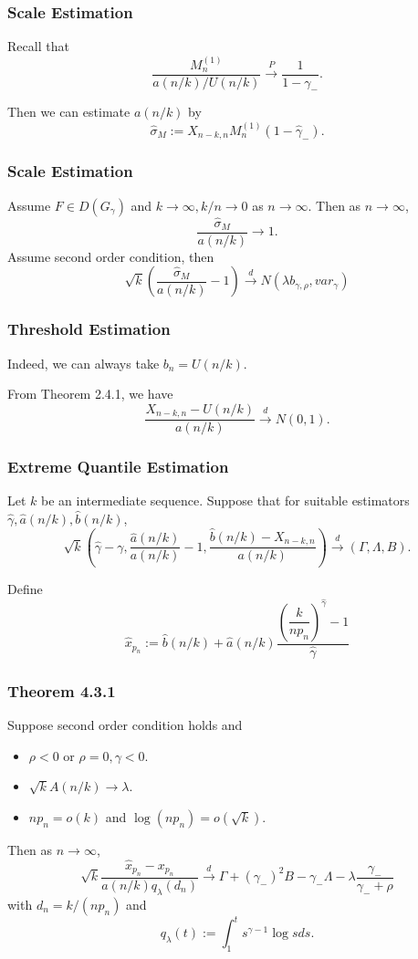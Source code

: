 \documentclass{beamer}
\begin{document}
\begin{frame}
    \frametitle{Scale Estimation}
Recall that
$$
\dfrac{M_n^{(1)}}{a(n/k)/U(n/k)}\stackrel{P}{\to} \dfrac{1}{1-\gamma_{-}}.
$$

Then we can estimate $a(n/k)$ by
$$
\hat{\sigma}_M:=X_{n-k,n}M_n^{(1)}(1-\hat{\gamma}_{-}).
$$
\end{frame}


\begin{frame}
    \frametitle{Scale Estimation}
    Assume $F\in D(G_{\gamma})$ and $k\to \infty, k/n \to 0$ as $n\to \infty$. Then as $n \to \infty$, 
    $$
    \dfrac{\hat{\sigma}_M}{a(n/k)}\to 1.
    $$
    Assume second order condition, then 
    $$
\sqrt{k}\left(\dfrac{\hat{\sigma}_M}{a(n/k)}-1\right) \stackrel{d}{\to} N(\lambda b_{\gamma,\rho},var_{\gamma})
    $$

\end{frame}

\begin{frame}
    \frametitle{Threshold Estimation}
Indeed, we can always take $b_n=U(n/k)$.

From Theorem 2.4.1, we have
$$
\dfrac{X_{n-k,n}-U(n/k)}{a(n/k)}\stackrel{d}{\to} N(0,1).
$$
    

\end{frame}


\begin{frame}
    \frametitle{Extreme Quantile Estimation}
    Let $k$ be an intermediate sequence. Suppose that for suitable estimators $\hat{\gamma}, \hat{a}(n/k), \hat{b}(n/k)$,
    $$
\sqrt{k}\left(\hat{\gamma}-\gamma,\dfrac{\hat{a}(n/k)}{a(n/k)}-1,\dfrac{\hat{b}(n/k)-X_{n-k,n}}{a(n/k)}\right)\stackrel{d}{\to}(\Gamma,\Lambda,B).
    $$

Define
$$
\hat{x}_{p_n}:=\hat{b}(n/k)+\hat{a}(n/k)\dfrac{\left(\dfrac{k}{np_n}\right)^{\hat{\gamma}}-1}{\hat{\gamma}}
$$
    

\end{frame}

\begin{frame}
    \frametitle{Theorem 4.3.1}
    Suppose second order condition holds and 
\begin{itemize}
    \item $\rho<0$ or $\rho=0,\gamma<0$.
    \item $\sqrt{k}A(n/k) \to \lambda$.
    \item $np_n=o(k)$ and $\log(np_n)=o(\sqrt{k})$.
\end{itemize}
Then as $n \to \infty$,
$$
\sqrt{k} \dfrac{\hat{x}_{p_n}-x_{p_n}}{a(n/k)q_{\lambda}(d_n)} \stackrel{d}{\to} \Gamma + (\gamma_{-})^2B -{\gamma_{-}}\Lambda -\lambda \dfrac{\gamma_{-}}{\gamma_{-}+\rho}
$$
with $d_n=k/(np_n)$ and 
$$
q_{\lambda}(t):=\int_{1}^{t}s^{\gamma-1}\log s ds.
$$
\end{frame}
\end{document}
